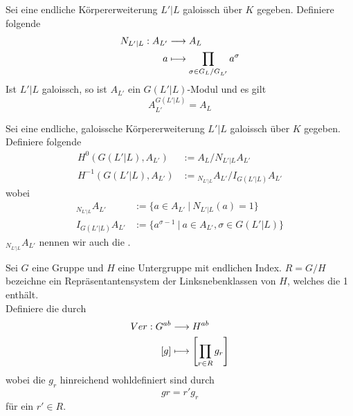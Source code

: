 \documentclass{book}
\renewcommand{\i}{^{-1}}
\begin{document}
Sei eine endliche Körpererweiterung $L'|L$ galoissch über $K$ gegeben. Definiere folgende 
\begin{align*}
N_{L'|L} : A_{L'} & \overset{}{\longrightarrow} A_L\\
a & \longmapsto \prod_{\sigma \in G_L/G_{L'}}a^\sigma
\end{align*}
Ist $L'|L$ galoissch, so ist $A_{L'}$ ein $G(L'|L)$-Modul und es gilt
\[ A_{L'}^{G(L'|L)}  = A_L \]

Sei eine endliche, galoissche Körpererweiterung $L'|L$ galoissch über $K$ gegeben. Definiere folgende 
\begin{align*}
H^0(G(L'|L), A_{L'} ) &:= A_L / N_{L'|L} A_{L'}\\
H\i (G(L'|L) , A_{L'}) &:= {}_{N_{L'|L}}A_{L'} / I_{G(L'|L)}A_{L'}
\end{align*}
wobei
\begin{align*}
{}_{N_{L'|L}}A_{L'} &:= \{a \in A_{L'}~|~N_{L'|L}(a) = 1\}\\
I_{G(L'|L)}A_{L'} &:= \{a^{\sigma - 1}~|~a \in A_{L'}, \sigma \in G(L'|L)\}
\end{align*}
${}_{N_{L'|L}}A_{L'}$ nennen wir auch die .

Sei $G$ eine Gruppe und $H$ eine Untergruppe mit endlichen Index. $R = G/H$ bezeichne ein Repräsentantensystem der Linksnebenklassen von $H$, welches die 1 enthält.\\ Definiere die  durch
\begin{align*}
Ver : G^{ab}& \overset{}{\longrightarrow} H^{ab}\\
[g] & \longmapsto \left[ \prod_{r \in R}g_r \right]
\end{align*}
wobei die $g_r$ hinreichend wohldefiniert sind durch
\[ gr = r'g_r \]
für ein $r' \in R$.
\end{document}
